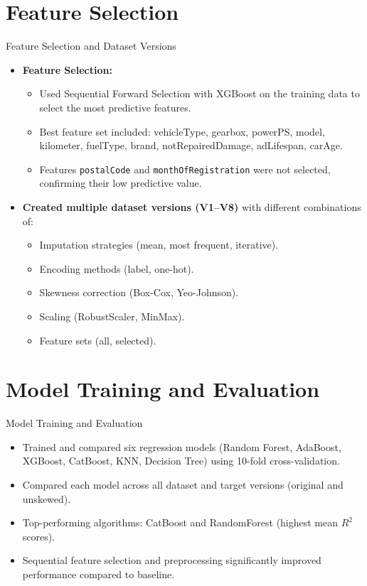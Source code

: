 \documentclass{beamer}
\begin{document}
\section{Feature Selection}
\begin{frame}{Feature Selection and Dataset Versions}
    \begin{itemize}
        \item \textbf{Feature Selection:}
        \begin{itemize}
            \item Used Sequential Forward Selection with XGBoost on the training data to select the most predictive features.
            \item Best feature set included: vehicleType, gearbox, powerPS, model, kilometer, fuelType, brand, notRepairedDamage, adLifespan, carAge.
            \item Features \texttt{postalCode} and \texttt{monthOfRegistration} were not selected, confirming their low predictive value.
        \end{itemize}
        \item \textbf{Created multiple dataset versions (V1–V8)} with different combinations of:
        \begin{itemize}
            \item Imputation strategies (mean, most frequent, iterative).
            \item Encoding methods (label, one-hot).
            \item Skewness correction (Box-Cox, Yeo-Johnson).
            \item Scaling (RobustScaler, MinMax).
            \item Feature sets (all, selected).
        \end{itemize}
    \end{itemize}
\end{frame}

\section{Model Training and Evaluation}
\begin{frame}{Model Training and Evaluation}
    \begin{itemize}
        \item Trained and compared six regression models (Random Forest, AdaBoost, XGBoost, CatBoost, KNN, Decision Tree) using 10-fold cross-validation.
        \item Compared each model across all dataset and target versions (original and unskewed).
        \item Top-performing algorithms: CatBoost and RandomForest (highest mean $R^2$ scores).
        \item Sequential feature selection and preprocessing significantly improved performance compared to baseline.
    \end{itemize}
\end{frame}
\end{document}
